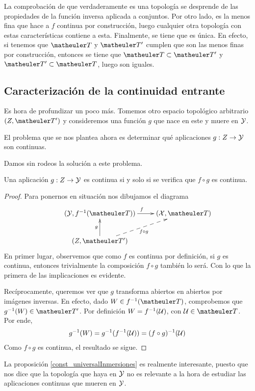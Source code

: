 La comprobación de que verdaderamente es una topología se desprende de las propiedades de la función inversa aplicada a conjuntos. Por otro lado, es la menos fina que hace a $f$ continua por construcción, luego cualquier otra topología con estas características contiene a esta. Finalmente, se tiene que es única. En efecto, si tenemos que $\T$ y $\T'$ cumplen que son las menos finas por construcción, entonces se tiene que $\T\subset \T'$ y $\T'\subset \T$, luego son iguales.

\subsection{Caracterización de la continuidad entrante}
Es hora de profundizar un poco más. Tomemos otro espacio topológico arbitrario $(Z,\T')$ y consideremos una función $g$ que nace en este y muere en $\mathcal{Y}$.

El problema que se nos plantea ahora es determinar qué aplicaciones $g:Z\to \mathcal{Y}$ son continuas.

Damos sin rodeos la solución a este problema.
\begin{prop}
	\label{const_universalInmersiones}
	Una aplicación $g:Z\to\mathcal{Y}$ es continua si y solo si se verifica que $f\circ g$ es continua.
\end{prop}
\begin{proof}
	Para ponernos en situación nos dibujamos el diagrama
	\begin{equation*}
	\xymatrix{
		&(\Y,f^{-1}(\T)) \ar[r]^f
		&(\X,\T) \\
		&(Z,\T') \ar@{-->}[ru]_{f\circ g} \ar[u]^g}
	\end{equation*}
	En primer lugar, observemos que como $f$ es continua por definición, si $g$ es continua, entonces trivialmente la composición $f\circ g$ también lo será. Con lo que la primera de las implicaciones es evidente.
	
	Recíprocamente, queremos ver que $g$ transforma abiertos en abiertos por imágenes inversas. En efecto, dado $W\in f^{-1}(\T)$, comprobemos que $g^{-1}(W)\in\T'$. Por definición $W=f^{-1}(\mathcal{U})$, con $\U\in\T$. Por ende,
	\begin{equation*}
		g^{-1}(W)=g^{-1}(f^{-1}(\mathcal{U}))=(f\circ g)^{-1}(\mathcal{U})
	\end{equation*}
	Como $f\circ g$ es continua, el resultado se sigue.
\end{proof}
\begin{obs}
	La proposición \ref{const_universalInmersiones} es realmente interesante, puesto que nos dice que la topología que haya en $\mathcal{Y}$ no es relevante a la hora de estudiar las aplicaciones continuas que mueren en $\mathcal{Y}$.
\end{obs}
